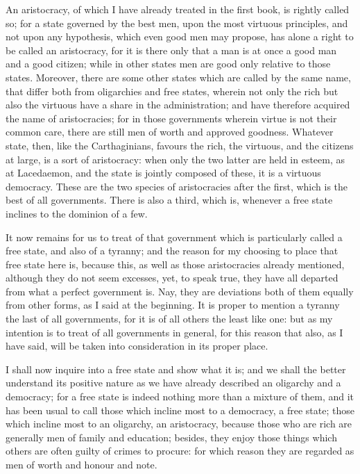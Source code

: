An aristocracy, of which I have already treated in the first book, is
rightly called so; for a state governed by the best men, upon the most
virtuous principles, and not upon any hypothesis, which even good men may
propose, has alone a right to be called an aristocracy, for it is there
only that a man is at once a good man and a good citizen; while in other
states men are good only relative to those states. Moreover, there are
some other states which are called by the same name, that differ both from
oligarchies and free states, wherein not only the rich but also the
virtuous have a share in the administration; and have therefore acquired
the name of aristocracies; for in those governments wherein virtue is not
their common care, there are still men of worth and approved goodness.
Whatever state, then, like the Carthaginians, favours the rich, the
virtuous, and the citizens at large, is a sort of aristocracy: when only
the two latter are held in esteem, as at Lacedaemon, and the state is
jointly composed of these, it is a virtuous democracy. These are the two
species of aristocracies after the first, which is the best of all
governments. There is also a third, which is, whenever a free state
inclines to the dominion of a few.


It now remains for us to treat of that government which is particularly
called a free state, and also of a tyranny; and the reason for my choosing
to place that free state here is, because this, as well as those
aristocracies already mentioned, although they do not seem excesses, yet,
to speak true, they have all departed from what a perfect government is.
Nay, they are deviations both of them equally from other forms, as I said
at the beginning. It is proper to mention a tyranny the last of all
governments, for it is of all others the least like one: but as my
intention is to treat of all governments in general, for this reason that
also, as I have said, will be taken into consideration in its proper
place.

I shall now inquire into a free state and show what it is; and we shall
the better understand its positive nature as we have already described an
oligarchy and a democracy; for a free state is indeed nothing more than a
mixture of them, and it has been usual to call those which incline most to
a democracy, a free state; those which incline most to an oligarchy, an
aristocracy, because those who are rich are generally men of family and
education; besides, they enjoy those things which others are often guilty
of crimes to procure: for which reason they are regarded as men of worth
and honour and note.

